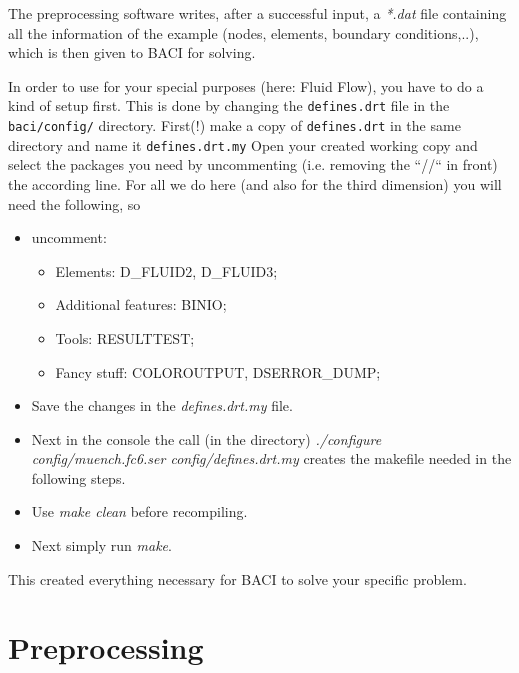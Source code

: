 The preprocessing software writes, after a successful input, a \emph{{*}.dat}
file containing all the information of the example (nodes, elements,
boundary conditions,..), which is then given to BACI for solving.

In order to use \baci{} for your special purposes (here: Fluid Flow), you have
to do a kind of setup first. This is done by changing the \texttt{defines.drt}
file in the \texttt{baci/config/} directory. 
First(!) make a copy of \texttt{defines.drt} in the same directory and name it \texttt{defines.drt.my}
Open your created working copy and select the
packages you need by uncommenting (i.e. removing the ``//`` in front) the according line. For all we do
here (and also for the third dimension) you will need the following,
so
\begin{itemize}
\item uncomment:
\begin{itemize}
\item Elements: D\_FLUID2, D\_FLUID3;
\item Additional features: BINIO;
\item Tools: RESULTTEST;
\item Fancy stuff: COLOROUTPUT, DSERROR\_DUMP;
\end{itemize}
\item Save the changes in the \emph{defines.drt.my} file. 
\item Next in the console the call (in the \baci{} directory) \emph{./configure
config/muench.fc6.ser config/defines.drt.my} creates the makefile needed
in the following steps. 
\item Use \emph{make clean} before recompiling. 
\item Next simply run \emph{make}.
\end{itemize}
This created everything necessary for BACI to solve your specific
problem.


\section{Preprocessing}


